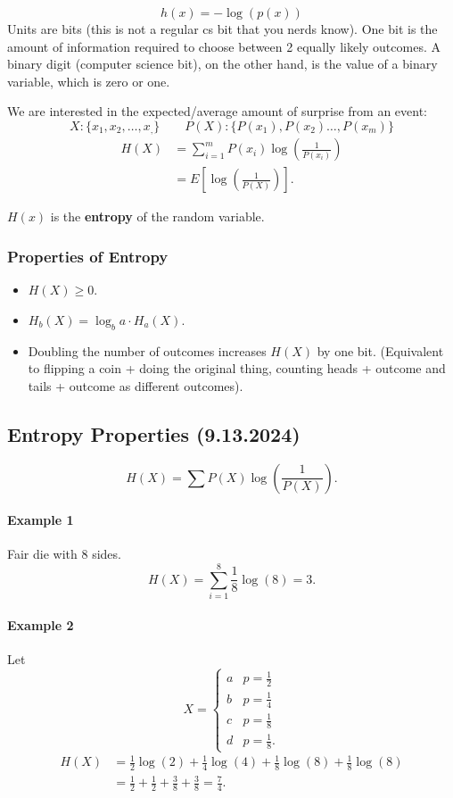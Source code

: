 \documentclass[12pt]{article}
\begin{document}
\[
h(x) = -\log(p(x))
\]
Units are bits (this is not a regular cs bit that you nerds know). One bit is the amount of information required to choose between 2 equally likely outcomes. A binary digit (computer science bit), on the other hand, is the value of a binary variable, which is zero or one.

We are interested in the expected/average amount of surprise from an event:
\[X:\{x_1,x_2,\dots,x_,\}\qquad P(X):\{P(x_1),P(x_2)\dots,P(x_m)\}\] 
\begin{align*}
H(X)&=\sum_{i=1}^mP(x_i)\log\left(\frac{1}{P(x_i)}\right)\\
&=E\left[\log\left(\frac{1}{P(X)}\right)\right].
\end{align*}

$H(x)$ is the \textbf{entropy} of the random variable.

\subsubsection{Properties of Entropy}
\begin{itemize}
    \item $H(X)\ge 0.$
    \item $H_b(X)=\log_ba\cdot H_a(X).$
    \item Doubling the number of outcomes increases $H(X)$ by one bit. (Equivalent to flipping a coin + doing the original thing, counting heads + outcome and tails + outcome as different outcomes).
\end{itemize}

\subsection{Entropy Properties (9.13.2024)}
\[H(X)=\sum P(X)\log\left(\frac{1}{P(X)}\right).\]
\paragraph{Example 1}
Fair die with 8 sides.
\[H(X)=\sum_{i=1}^8\frac{1}{8}\log(8)=3.\]

\paragraph{Example 2}
Let
\[X=\begin{cases}
a&p=\frac{1}{2}\\
b&p=\frac{1}{4}\\
c&p=\frac{1}{8}\\
d&p=\frac{1}{8}.
\end{cases}\]
\begin{align*}H(X)&=\frac{1}{2}\log(2)+\frac{1}{4}\log(4)+\frac{1}{8}\log(8)+\frac{1}{8}\log(8)\\&=\frac{1}{2}+\frac{1}{2}+\frac{3}{8}+\frac{3}{8}=\frac{7}{4}.\end{align*}
\end{document}
